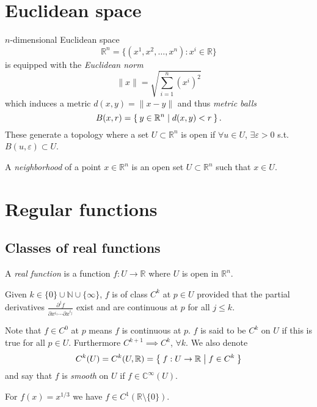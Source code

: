 \section{Euclidean space}

$n$-dimensional Euclidean space
$$
  \mathbb{R}^n
= \{ (x^1, x^2, \dots, x^n) : x^i \in \mathbb{R} \}
$$
is equipped with the \emph{Euclidean norm}
$$
\| x \| = \sqrt{ \sum_{i=1}^n (x^i)^2 }
$$
which induces a metric $d(x, y) = \| x - y \|$
and thus \emph{metric balls}
$$
  B(x, r)
= \Set{ y \in \mathbb{R}^n | d(x, y) < r }.
$$
These generate a topology where a set $U \subset \mathbb{R}^n$ is open
if $\forall u \in U$, $\exists \varepsilon > 0$ s.t.
$B(u, \varepsilon) \subset U$.

\begin{defn}[Neighborhood]
A \emph{neighborhood} of a point $x \in \mathbb{R}^n$ is an open set
$U \subset \mathbb{R}^n$ such that $x \in U$.
\end{defn}


\section{Regular functions}

\subsection{Classes of real functions}

\begin{defn}
A \emph{real function} is a function $f : U \to \mathbb{R}$ where
$U$ is open in $\mathbb{R}^n$.

Given $k \in \{ 0 \} \cup \mathbb{N} \cup \{ \infty \}$, $f$ is of
class $C^k$ at $p \in U$ provided that the partial derivatives
$\frac{\partial^j f}{\partial x^{i_1} \cdots \partial x^{i_j}}$ exist
and are continuous at $p$ for all $j \leq k$.
\end{defn}

Note that $f \in C^0$ at $p$ means $f$ is continuous at $p$. $f$ is
said to be $C^k$ on $U$ if this is true for all $p \in U$. Furthermore
$C^{k+1} \implies C^k$, $\forall k$. We also  denote
$$
  C^k(U)
= C^k(U, \mathbb{R})
= \Set{ f: U \to \mathbb{R} | f \in C^k }
$$
and say that $f$ is \emph{smooth} on $U$ if $f \in
\mathbb{C}^\infty(U)$.

\begin{xmpl}
For $f(x) = x^{1 / 3}$ we have $f \in C^1(\mathbb{R} \setminus \{ 0 \})$.
\end{xmpl}

